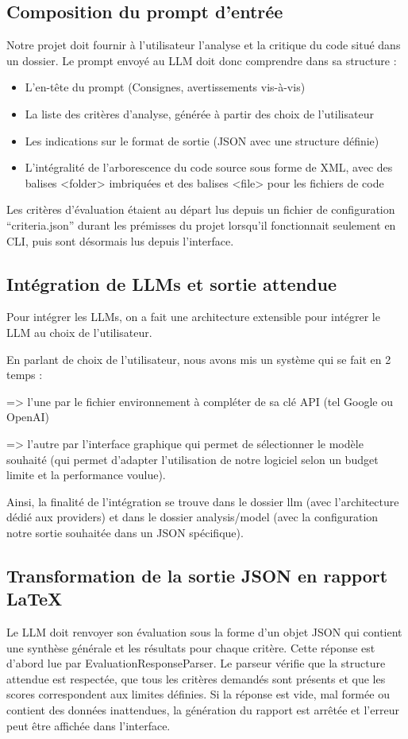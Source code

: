 \documentclass[11pt,a4paper]{article}
\begin{document}
\subsection{Composition du prompt d’entrée}
Notre projet doit fournir à l’utilisateur l’analyse et la critique du code situé dans un dossier. Le prompt envoyé au LLM doit donc comprendre dans sa structure :

\begin{itemize}
    \item L’en-tête du prompt (Consignes, avertissements vis-à-vis)
    \item La liste des critères d’analyse, générée à partir des choix de l’utilisateur
    \item Les indications sur le format de sortie (JSON avec une structure définie)
    \item L’intégralité de l’arborescence du code source sous forme de XML, avec des balises <folder> imbriquées et des balises <file> pour les fichiers de code
\end{itemize}

Les critères d’évaluation étaient au départ lus depuis un fichier de configuration “criteria.json” durant les prémisses du projet lorsqu’il fonctionnait seulement en CLI, puis sont désormais lus depuis l’interface.

\subsection{Intégration de LLMs et sortie attendue}
Pour intégrer les LLMs, on a fait une architecture extensible pour intégrer le LLM au choix de l’utilisateur.

En parlant de choix de l’utilisateur, nous avons mis un système qui se fait en 2 temps :

=> l’une par le fichier environnement à compléter de sa clé API (tel Google ou OpenAI)

=> l’autre par l’interface graphique qui permet de sélectionner le modèle souhaité (qui permet d’adapter l’utilisation de notre logiciel selon un budget limite et la performance voulue).

Ainsi, la finalité de l’intégration se trouve dans le dossier llm (avec l’architecture dédié aux providers) et dans le dossier analysis/model (avec la configuration notre sortie souhaitée dans un JSON spécifique).

\subsection{Transformation de la sortie JSON en rapport LaTeX}
Le LLM doit renvoyer son évaluation sous la forme d’un objet JSON qui contient une synthèse générale et les résultats pour chaque critère. Cette réponse est d’abord lue par EvaluationResponseParser. Le parseur vérifie que la structure attendue est respectée, que tous les critères demandés sont présents et que les scores correspondent aux limites définies. Si la réponse est vide, mal formée ou contient des données inattendues, la génération du rapport est arrêtée et l’erreur peut être affichée dans l’interface.
\end{document}
